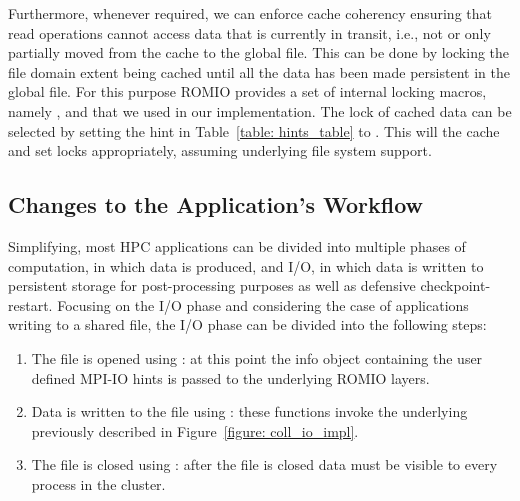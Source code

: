 Furthermore, whenever required, we can enforce cache coherency ensuring that read operations cannot access data that is currently in transit, i.e., not or only partially moved from the cache to the global file. This can be done by locking the file domain extent being cached until all the data has been made persistent in the global file. For this purpose ROMIO provides a set of internal locking macros, namely ,  and  that we used in our implementation. The lock of cached data can be selected by setting the  hint in Table~\ref{table: hints_table} to . This will  the cache and set locks appropriately, assuming underlying file system support.


\subsection{Changes to the Application's Workflow}
\label{subsec: new-workflow}
Simplifying, most HPC applications can be divided into multiple phases of computation, in which data is produced, and I/O, in which data is written to persistent storage for post-processing purposes as well as defensive checkpoint-restart. Focusing on the I/O phase and considering the case of applications writing to a shared file, the I/O phase can be divided into the following steps:
\begin{enumerate}
        \item The file is opened using : at this point the info object containing the user defined MPI-IO hints is passed to the underlying ROMIO layers.
        \item Data is written to the file using : these functions invoke the underlying  previously described in Figure~\ref{figure: coll_io_impl}.
        \item The file is closed using : after the file is closed data must be visible to every process in the cluster. 
\end{enumerate}

